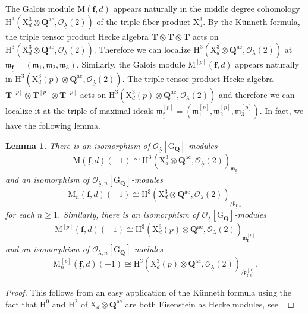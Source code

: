 \documentclass[10pt]{amsart}
\numberwithin{equation}{section}
\theoremstyle{plain}
\newtheorem{lemma}[theorem]{Lemma}
\numberwithin{equation}{section}
\theoremstyle{definition}
\theoremstyle{remark}
\def\ac{\mathrm{ac}}
\def\frakm{\mathfrak{m}}
\def\Qbar{\QQ^{\ac}}
\def\ac{\mathrm{ac}}
\def\undlamb{\underline{\lambda}}
\def\triplef{\underline{\mathbf{f}}}
\def\calO{\mathcal{O}}
\def\frakm{\mathfrak{m}}
\def\frakp{\mathfrak{p}}
\def\QQ{\mathbf{Q}}
\def\TT{\mathbf{T}}
\def\rmG{\mathrm{G}}
\def\rmH{\mathrm{H}}
\def\rmM{\mathrm{M}}
\def\rmX{\mathrm{X}}
\begin{document}
The Galois module $\rmM(\triplef, d)$ appears naturally in the middle degree cohomology $\rmH^{3}(\rmX^{3}_{d}\otimes{\Qbar}, \calO_{\undlamb}(2))$ of the triple fiber product  $\rmX^{3}_{d}$. By the K\"unneth formula,  the triple tensor product Hecke algebra $\TT\otimes \TT\otimes \TT$ acts on $\rmH^{3}(\rmX^{3}_{d}\otimes{\Qbar}, \calO_{\undlamb}(2))$. Therefore we can localize $\rmH^{3}(\rmX^{3}_{d}\otimes{\Qbar}, \calO_{\undlamb}(2))$ at $\frakm_{\triplef}=(\frakm_{1}, \frakm_{2},\frakm_{3})$. Similarly, the  Galois module $\rmM^{[p]}(\triplef, d)$ appears naturally in $\rmH^{3}(\rmX^{3}_{d}(p)\otimes{\Qbar}, \calO_{\undlamb}(2))$. The triple tensor product Hecke algebra $\TT^{[p]}\otimes \TT^{[p]}\otimes \TT^{[p]}$ acts on $\rmH^{3}(\rmX^{3}_{d}(p)\otimes{\Qbar}, \calO_{\undlamb}(2))$ and therefore we can localize it at the triple of maximal ideals $\frakm^{[p]}_{\triplef}=(\frakm^{[p]}_{1}, \frakm^{[p]}_{2}, \frakm^{[p]}_{3})$.
In fact, we have the following lemma.
\begin{lemma}\label{kunneth}
There is an isomorphism of $\calO_{\undlamb}[\rmG_{\QQ}]$-modules
\begin{equation*}
\rmM(\triplef, d)(-1)\cong \rmH^{3}(\rmX^{3}_{d}\otimes{\Qbar}, \calO_{\undlamb}(2))_{\frakm_{\triplef}}
\end{equation*} 
and an isomorphism of $\calO_{\undlamb, n}[\rmG_{\QQ}]$-modules
\begin{equation*}
\rmM_{n}(\triplef, d)(-1)\cong \rmH^{3}(\rmX^{3}_{d}\otimes{\Qbar}, \calO_{\undlamb}(2))_{/\frakp_{\triplef,n}} 
\end{equation*} 
for each $n\geq 1$. Similarly, there is an isomorphism of $\calO_{\undlamb}[\rmG_{\QQ}]$-modules
\begin{equation*}
\rmM^{[p]}(\triplef, d)(-1)\cong \rmH^{3}(\rmX^{3}_{d}(p)\otimes{\Qbar}, \calO_{\undlamb}(2))_{\frakm^{[p]}_{\triplef}}
\end{equation*} 
and an isomorphism of $\calO_{\undlamb, n}[\rmG_{\QQ}]$-modules
\begin{equation*}
\rmM^{[p]}_{n}(\triplef, d)(-1)\cong \rmH^{3}(\rmX^{3}_{d}(p)\otimes{\Qbar}, \calO_{\undlamb}(2))_{/\frakp^{[p]}_{\triplef,n}}.
\end{equation*}
\end{lemma}
\begin{proof}
This follows from an easy application of the K\"{u}nneth formula using the fact that $\rmH^{0}$ and $\rmH^{2}$ of $\rmX_{d}\otimes{\QQ}^{\ac}$ are both Eisenstein as Hecke modules, see \cite[Lemma 3]{DT}. 
\end{proof}
\end{document}
